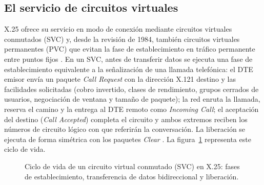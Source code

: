 \documentclass[12pt,a4paper]{article}
\begin{document}
\subsection{El servicio de circuitos virtuales}

X.25 ofrece su servicio en modo de conexión mediante circuitos virtuales conmutados (SVC) y, desde la revisión de 1984, también circuitos virtuales permanentes (PVC) que evitan la fase de establecimiento en tráfico permanente entre puntos fijos \cite{itux25}. En un SVC, antes de transferir datos se ejecuta una fase de establecimiento equivalente a la señalización de una llamada telefónica: el DTE emisor envía un paquete \emph{Call Request} con la dirección X.121 destino y las facilidades solicitadas (cobro invertido, clases de rendimiento, grupos cerrados de usuarios, negociación de ventana y tamaño de paquete); la red enruta la llamada, reserva el camino y la entrega al DTE remoto como \emph{Incoming Call}; el aceptación del destino (\emph{Call Accepted}) completa el circuito y ambos extremos reciben los números de circuito lógico con que referirán la conversación. La liberación se ejecuta de forma simétrica con los paquetes \emph{Clear} \cite{rybczynski1980, stallings2004}. La figura~\ref{fig:svc} representa este ciclo de vida.

\begin{figure}[h]
    \centering
    \caption{Ciclo de vida de un circuito virtual conmutado (SVC) en X.25: fases de establecimiento, transferencia de datos bidireccional y liberación.}
    \label{fig:svc}
\end{figure}
\end{document}
